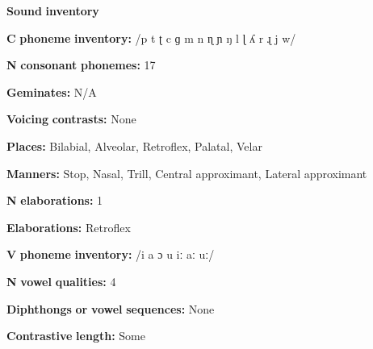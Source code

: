 \begin{styleBody}
\textbf{Sound} \textbf{inventory}
\end{styleBody}

\begin{styleBody}
\textbf{C} \textbf{phoneme} \textbf{inventory:} /p t ʈ c ɡ m n ɳ ɲ ŋ l ɭ ʎ r ɻ j w/
\end{styleBody}

\begin{styleBody}
\textbf{N} \textbf{consonant} \textbf{phonemes:} 17
\end{styleBody}

\begin{styleBody}
\textbf{Geminates:} N/A
\end{styleBody}

\begin{styleBody}
\textbf{Voicing} \textbf{contrasts:} None
\end{styleBody}

\begin{styleBody}
\textbf{Places:} Bilabial, Alveolar, Retroflex, Palatal, Velar
\end{styleBody}

\begin{styleBody}
\textbf{Manners:} Stop, Nasal, Trill, Central approximant, Lateral approximant
\end{styleBody}

\begin{styleBody}
\textbf{N} \textbf{elaborations:} 1
\end{styleBody}

\begin{styleBody}
\textbf{Elaborations:} Retroflex
\end{styleBody}

\begin{styleBody}
\textbf{V} \textbf{phoneme} \textbf{inventory:} /i a ɔ u iː aː uː/
\end{styleBody}

\begin{styleBody}
\textbf{N} \textbf{vowel} \textbf{qualities:} 4
\end{styleBody}

\begin{styleBody}
\textbf{Diphthongs} \textbf{or} \textbf{vowel} \textbf{sequences:} None
\end{styleBody}

\begin{styleBody}
\textbf{Contrastive} \textbf{length:} Some
\end{styleBody}


